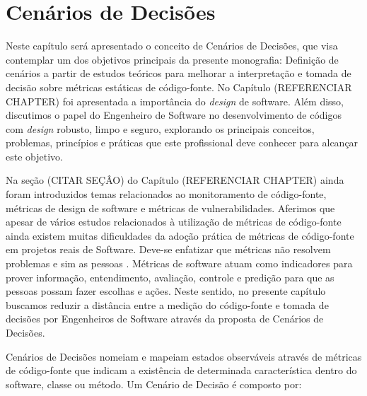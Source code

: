 \chapter{Cenários de Decisões}
\label{cap-cenarios}

Neste capítulo será apresentado o conceito de Cenários de Decisões, que visa contemplar um dos objetivos principais da presente monografia: Definição de cenários a partir de estudos teóricos para melhorar a interpretação e tomada de decisão sobre métricas estáticas de código-fonte. No Capítulo (REFERENCIAR CHAPTER) foi apresentada a importância do \emph{design} de software. Além disso, discutimos o papel do Engenheiro de Software no desenvolvimento de códigos com \emph{design} robusto, limpo e seguro, explorando os principais conceitos, problemas, princípios e práticas que este profissional deve conhecer para alcançar este objetivo. 

%

Na seção (CITAR SEÇÂO) do Capítulo (REFERENCIAR CHAPTER) ainda foram introduzidos temas relacionados ao monitoramento de código-fonte, métricas de design de software e métricas de vulnerabilidades. Aferimos que apesar de vários estudos relacionados à utilização de métricas de código-fonte ainda existem muitas dificuldades da adoção prática de métricas de código-fonte em projetos reais de Software. Deve-se enfatizar que métricas não resolvem problemas e sim as pessoas \cite{westfall2005}. Métricas de software atuam como indicadores para prover informação, entendimento, avaliação, controle e predição para que as pessoas possam fazer escolhas e ações. Neste sentido, no presente capítulo buscamos reduzir a distância entre a medição do código-fonte e tomada de decisões por Engenheiros de Software através da proposta de Cenários de Decisões.

%

Cenários de Decisões nomeiam e mapeiam estados observáveis através de métricas de código-fonte que indicam a existência de determinada característica dentro do software, classe ou método. Um Cenário de Decisão é composto por:

%

